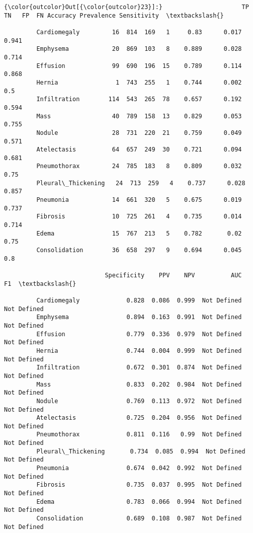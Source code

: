 \documentclass[11pt]{article}
\begin{document}
\begin{Verbatim}[commandchars=\\\{\}]
{\color{outcolor}Out[{\color{outcolor}23}]:}                      TP   TN   FP  FN Accuracy Prevalence Sensitivity  \textbackslash{}
                                                                                 
         Cardiomegaly         16  814  169   1     0.83      0.017       0.941   
         Emphysema            20  869  103   8    0.889      0.028       0.714   
         Effusion             99  690  196  15    0.789      0.114       0.868   
         Hernia                1  743  255   1    0.744      0.002         0.5   
         Infiltration        114  543  265  78    0.657      0.192       0.594   
         Mass                 40  789  158  13    0.829      0.053       0.755   
         Nodule               28  731  220  21    0.759      0.049       0.571   
         Atelectasis          64  657  249  30    0.721      0.094       0.681   
         Pneumothorax         24  785  183   8    0.809      0.032        0.75   
         Pleural\_Thickening   24  713  259   4    0.737      0.028       0.857   
         Pneumonia            14  661  320   5    0.675      0.019       0.737   
         Fibrosis             10  725  261   4    0.735      0.014       0.714   
         Edema                15  767  213   5    0.782       0.02        0.75   
         Consolidation        36  658  297   9    0.694      0.045         0.8   
         
                            Specificity    PPV    NPV          AUC           F1  \textbackslash{}
                                                                                  
         Cardiomegaly             0.828  0.086  0.999  Not Defined  Not Defined   
         Emphysema                0.894  0.163  0.991  Not Defined  Not Defined   
         Effusion                 0.779  0.336  0.979  Not Defined  Not Defined   
         Hernia                   0.744  0.004  0.999  Not Defined  Not Defined   
         Infiltration             0.672  0.301  0.874  Not Defined  Not Defined   
         Mass                     0.833  0.202  0.984  Not Defined  Not Defined   
         Nodule                   0.769  0.113  0.972  Not Defined  Not Defined   
         Atelectasis              0.725  0.204  0.956  Not Defined  Not Defined   
         Pneumothorax             0.811  0.116   0.99  Not Defined  Not Defined   
         Pleural\_Thickening       0.734  0.085  0.994  Not Defined  Not Defined   
         Pneumonia                0.674  0.042  0.992  Not Defined  Not Defined   
         Fibrosis                 0.735  0.037  0.995  Not Defined  Not Defined   
         Edema                    0.783  0.066  0.994  Not Defined  Not Defined   
         Consolidation            0.689  0.108  0.987  Not Defined  Not Defined   
         

\end{Verbatim}
\end{document}
